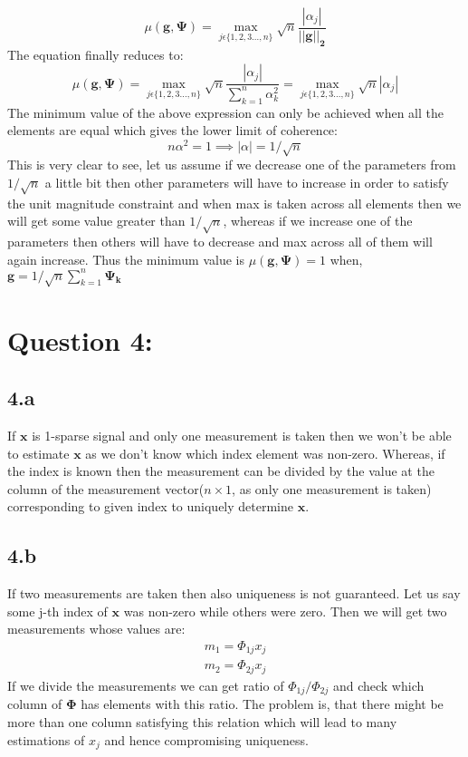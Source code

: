 \documentclass[12pt]{article}
\begin{document}
\begin{equation*}
    \mu(\boldsymbol{g}, \boldsymbol{\Psi}) =  \max_{j \epsilon \{1,2,3...,n\}}\sqrt{n}\frac{|\alpha_j|}{||\boldsymbol{g||_2}}
\end{equation*}
The equation finally reduces to:
\begin{equation*}
    \mu(\boldsymbol{g}, \boldsymbol{\Psi}) =  \max_{j \epsilon \{1,2,3...,n\}}\sqrt{n}\frac{|\alpha_j|}{\sum_{k=1}^{n}\alpha_k^2} = \max_{j \epsilon \{1,2,3...,n\}}\sqrt{n}|\alpha_j|
\end{equation*}
The minimum value of the above expression can only be achieved when all the elements are equal which gives the lower limit of coherence:
\begin{equation*}
    n\alpha^2 = 1 \implies |\alpha| = 1/\sqrt{n}
\end{equation*}
This is very clear to see, let us assume if we decrease one of the parameters from $1/\sqrt{n}$ a little bit then other parameters will have to increase in order to satisfy the unit magnitude constraint and when max is taken across all elements then we will get some value greater than $1/\sqrt{n}$, whereas if we increase one of the parameters then others will have to decrease and max across all of them will again increase. Thus the minimum value is $\mu(\boldsymbol{g}, \boldsymbol{\Psi}) = 1$ when, $\boldsymbol{g} = 1/\sqrt{n}\sum_{k=1}^{n}\boldsymbol{\Psi_k}$

\section*{Question 4:}
\subsection*{4.a}
If $\boldsymbol{x}$ is 1-sparse signal and only one measurement is taken then we won't be able to estimate $\boldsymbol{x}$ as we don't know which index element was non-zero. Whereas, if the index is known then the measurement can be divided by the value at the column of the measurement vector($n\times1$, as only one measurement is taken) corresponding to given index to uniquely determine $\boldsymbol{x}$.
\subsection*{4.b}
If two measurements are taken then also uniqueness is not guaranteed. Let us say some j-th index of $\boldsymbol{x}$ was non-zero while others were zero. Then we will get two measurements whose values are:
\begin{align*}
    m_1 = \Phi_{1j}x_j\\
    m_2 = \Phi_{2j}x_j
\end{align*}
If we divide the measurements we can get ratio of $\Phi_{1j}/\Phi_{2j}$ and check which column of $\boldsymbol{\Phi}$ has elements with this ratio. The problem is, that there might be more than one column satisfying this relation which will lead to many estimations of $x_j$ and hence compromising uniqueness.
\end{document}
